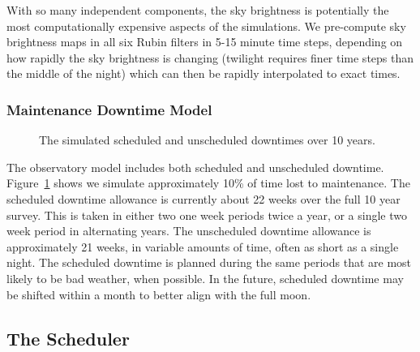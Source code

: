 With so many independent components, the sky brightness is potentially the most computationally expensive aspects of the simulations. We pre-compute sky brightness maps in all six Rubin filters in 5-15 minute time steps, depending on how rapidly the sky brightness is changing (twilight requires finer time steps than the middle of the night) which can then be rapidly interpolated to exact times.

\subsubsection{Maintenance Downtime Model}

\begin{figure}
\caption{The simulated scheduled and unscheduled downtimes over 10 years.}\label{fig:downtime}
\end{figure}

The observatory model includes both scheduled and unscheduled downtime. Figure~\ref{fig:downtime} shows we simulate approximately 10\% of time lost to maintenance. The scheduled downtime allowance is currently about 22 weeks over the full 10 year survey. This is taken in either two one week periods twice a year, or a single two week period in alternating years. The unscheduled downtime allowance is approximately 21 weeks, in variable amounts of time, often as short as a single night. The scheduled downtime is planned during the same periods that are most likely to be bad weather, when possible. In the future, scheduled downtime may be shifted within a month to better align with the full moon.


\subsection{The Scheduler}\label{sec:scheduler}

